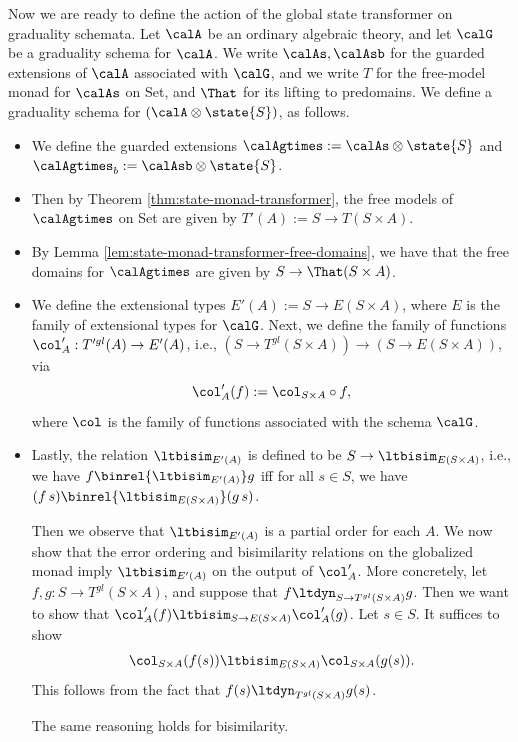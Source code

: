 Now we are ready to define the action of the global state transformer on
graduality schemata. Let $\calA$ be an ordinary algebraic theory, and let
$\calG$ be a graduality schema for $\calA$.
%
We write $\calAs, \calAsb$ for the guarded extensions of $\calA$ associated with
$\calG$, and we write $T$ for the free-model monad for $\calAs$ on Set, and
$\That$ for its lifting to predomains.
%
We define a graduality schema for $(\calA \otimes \state{S})$, as follows.
\begin{itemize}
    \item We define the guarded extensions 
    $\calAgtimes := \calAs \otimes \state{S}$ and 
    $\calAgtimes_b := \calAsb \otimes \state{S}$.

    \item Then by Theorem \ref{thm:state-monad-transformer}, the free models of
    $\calAgtimes$ on Set are given by $T'(A) := S \to T(S \times A)$.

    \item By Lemma \ref{lem:state-monad-transformer-free-domains}, we have that 
    the free domains for $\calAgtimes$ are given by $S \to \That(S \times A)$.


    \item We define the extensional types $E'(A) := S \to E(S \times A)$, where
    $E$ is the family of extensional types for $\calG$. Next, we define the
    family of functions
    $\col'_A : T'^{gl}(A) \to E'(A)$, i.e., $(S \to T^{gl}(S \times A)) \to (S \to E(S \times A))$, via 
    \[ \col'_A(f) := \col_{S \times A} \circ f, \]
    where $\col$ is the family of functions associated with the schema $\calG$.

    \item Lastly, the relation $\ltbisim_{E'(A)}$ is defined to be $S \to
    \ltbisim_{E(S \times A)}$, i.e., we have $f \binrel{\ltbisim_{E'(A)}} g$ iff
    for all $s \in S$, we have $(f\, s) \binrel{\ltbisim_{E(S \times A)}} (g\, s)$.
    
    Then we observe that $\ltbisim_{E'(A)}$ is a partial order for each $A$. We
    now show that the error ordering and bisimilarity relations on the
    globalized monad imply $\ltbisim_{E'(A)}$ on the output of $\col'_A$.
    More concretely, let $f, g : S \to T^{gl}(S \times A)$, and suppose that 
    $f \ltdyn_{S \to T^{gl}(S \times A)} g$. Then we want to show that
    $\col'_A(f) \ltbisim_{S \to E(S \times A)} \col'_A(g)$. Let $s \in S$.
    It suffices to show
    \[ \col_{S \times A}(f(s)) \ltbisim_{E(S \times A)} \col_{S \times A}(g(s)). \] 
    This follows from the fact that $f(s) \ltdyn_{T^{gl}(S \times A)} g(s)$.

    The same reasoning holds for bisimilarity.
\end{itemize}


